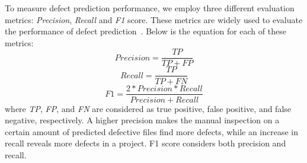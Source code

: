 To measure defect prediction performance, we employ three different evaluation metrics: \textit{Precision}, \textit{Recall} and \textit{F1} score. These metrics are widely used to evaluate the performance of defect prediction~\cite{menzies2007data, menzies2010defect}. %
Below is the equation for each of these metrics:
\begin{equation}
\label{eq:precision}
Precision = \frac{TP}{TP+FP} 
\end{equation}
\begin{equation}
\label{eq:recall}
Recall = \frac{TP}{TP+FN}
\end{equation}
\begin{equation}
\label{eq:f1}
F1 = \frac{2 * Precision * Recall}{Precision + Recall}
\end{equation}
where \textit{TP}, \textit{FP}, and \textit{FN} are considered as true positive, false positive, and false negative, respectively.
A higher precision makes the manual inspection on a certain amount of predicted defective files find more defects, while an increase in recall reveals more defects in a project. F1 score considers both precision and recall. 


